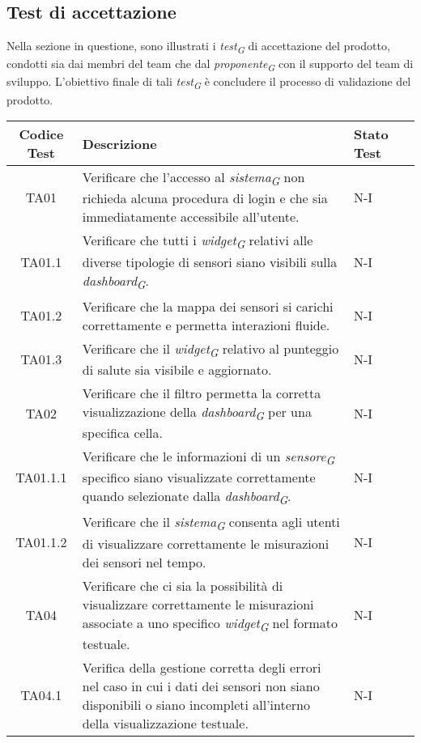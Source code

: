 \subsection{Test di accettazione}
Nella sezione in questione, sono illustrati i \textit{test}\textsubscript{\textit{G}} di accettazione del prodotto, condotti sia dai membri del team che dal \textit{proponente}\textsubscript{\textit{G}} con il supporto del team di sviluppo. L'obiettivo finale di tali \textit{test}\textsubscript{\textit{G}} è concludere il processo di validazione del prodotto.
\\
\begin{longtable}{|c|p{5cm}|p{2cm}|c|}
    \hline
    Codice Test & Descrizione & Stato Test \\
    \hline
    TA01 & Verificare che l'accesso al \textit{sistema}\textsubscript{\textit{G}} non richieda alcuna procedura di login e che sia immediatamente accessibile all'utente. & N-I \\
    \hline
    TA01.1 & Verificare che tutti i \textit{widget}\textsubscript{\textit{G}} relativi alle diverse tipologie di sensori siano visibili sulla \textit{dashboard}\textsubscript{\textit{G}}. & N-I \\
    \hline
    TA01.2 & Verificare che la mappa dei sensori si carichi correttamente e permetta interazioni fluide. & N-I \\
    \hline
    TA01.3 & Verificare che il \textit{widget}\textsubscript{\textit{G}} relativo al punteggio di salute sia visibile e aggiornato. & N-I \\
    \hline
    TA02 & Verificare che il filtro permetta la corretta visualizzazione della \textit{dashboard}\textsubscript{\textit{G}} per una specifica cella. & N-I \\
    \hline
    TA01.1.1 & Verificare che le informazioni di un \textit{sensore}\textsubscript{\textit{G}} specifico siano visualizzate correttamente quando selezionate dalla \textit{dashboard}\textsubscript{\textit{G}}. & N-I \\
    \hline
    TA01.1.2 & Verificare che il \textit{sistema}\textsubscript{\textit{G}} consenta agli utenti di visualizzare correttamente le misurazioni dei sensori nel tempo. & N-I \\
    \hline
    TA04 & Verificare che ci sia la possibilità di visualizzare correttamente le misurazioni associate a uno specifico \textit{widget}\textsubscript{\textit{G}} nel formato testuale.  & N-I \\
    \hline
    TA04.1 & Verifica della gestione corretta degli errori nel caso in cui i dati dei sensori non siano disponibili o siano incompleti all'interno della visualizzazione testuale. & N-I \\

\end{longtable}
